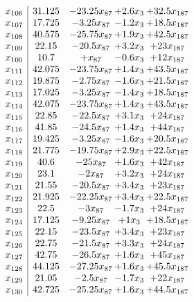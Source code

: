 \documentclass[11pt]{article}
\begin{document}
\[\begin{array}{c| c c@{\hskip 2pt} c@{\hskip 2pt} c@{\hskip 2pt} }
 x_{106}   &  31.125 & -23.25 x_{87} & + 2.6 x_{3} & + 32.5 x_{187}\\
 x_{107}   &  17.725 & -3.25 x_{87} & -1.2 x_{3} & + 18.5 x_{187}\\
 x_{108}   &  40.575 & -25.75 x_{87} & + 1.9 x_{3} & + 42.5 x_{187}\\
 x_{109}   &  22.15 & -20.5 x_{87} & + 3.2 x_{3} & + 23 x_{187}\\
 x_{100}   &  10.7 & +  x_{87} & -0.6 x_{3} & + 12 x_{187}\\
 x_{111}   &  42.075 & -23.75 x_{87} & + 1.4 x_{3} & + 43.5 x_{187}\\
 x_{112}   &  19.875 & -2.75 x_{87} & -1.6 x_{3} & + 21.5 x_{187}\\
 x_{113}   &  17.025 & -3.25 x_{87} & -1.4 x_{3} & + 18.5 x_{187}\\
 x_{114}   &  42.075 & -23.75 x_{87} & + 1.4 x_{3} & + 43.5 x_{187}\\
 x_{115}   &  22.85 & -22.5 x_{87} & + 3.1 x_{3} & + 24 x_{187}\\
 x_{116}   &  41.85 & -24.5 x_{87} & + 1.4 x_{3} & + 44 x_{187}\\
 x_{117}   &  19.425 & -3.25 x_{87} & -1.6 x_{3} & + 20.5 x_{187}\\
 x_{118}   &  21.775 & -19.75 x_{87} & + 2.9 x_{3} & + 22.5 x_{187}\\
 x_{119}   &  40.6 & -25 x_{87} & + 1.6 x_{3} & + 42 x_{187}\\
 x_{120}   &  23.1 & -2 x_{87} & + 3.2 x_{3} & + 24 x_{187}\\
 x_{121}   &  21.55 & -20.5 x_{87} & + 3.4 x_{3} & + 23 x_{187}\\
 x_{122}   &  21.925 & -22.25 x_{87} & + 3.4 x_{3} & + 22.5 x_{187}\\
 x_{123}   &  22.5 & -3 x_{87} & -1.7 x_{3} & + 24 x_{187}\\
 x_{124}   &  17.125 & -9.25 x_{87} & + 1 x_{3} & + 18.5 x_{187}\\
 x_{125}   &  22.15 & -23.5 x_{87} & + 3.4 x_{3} & + 23 x_{187}\\
 x_{126}   &  22.75 & -21.5 x_{87} & + 3.3 x_{3} & + 24 x_{187}\\
 x_{127}   &  42.75 & -26.5 x_{87} & + 1.6 x_{3} & + 45 x_{187}\\
 x_{128}   &  44.125 & -27.25 x_{87} & + 1.6 x_{3} & + 45.5 x_{187}\\
 x_{129}   &  21.05 & -2.5 x_{87} & -1.7 x_{3} & + 22 x_{187}\\
 x_{130}   &  42.725 & -25.25 x_{87} & + 1.6 x_{3} & + 44.5 x_{187}\\

\end{array}\]
\end{document}
